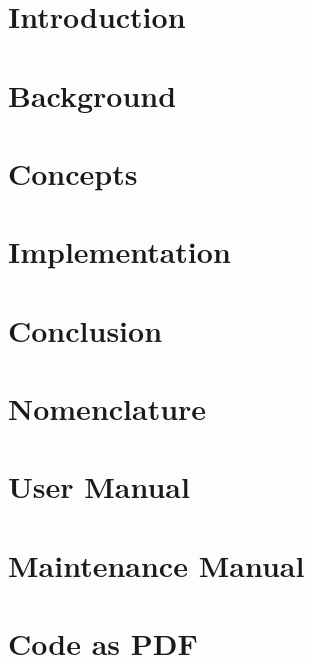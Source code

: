 \documentclass[11pt]{report}
\begin{document}
  
  
  
  
  
  \tableofcontents
  
  \chapter{Introduction}
  \label{cha:intro}
  
    
  
  \chapter{Background}
  \label{cha:background}
  
    
  
  \chapter{Concepts}
  \label{cha:concepts}
  
    
  
  \chapter{Implementation}
  \label{cha:impl}
  
    
    
  \chapter{Conclusion}
  \label{cha:conc}
  
    
  
  \chapter*{Nomenclature}
  \label{cha:glossary}
  
    
  
  \chapter*{User Manual}
  \label{cha:user}
    
    
  
  \chapter*{Maintenance Manual}
  \label{cha:maint}
  
    
  
  \chapter*{Code as PDF}
  \label{cha:code}
  
  \clearpage
  \nocite{*} %
  
\end{document}
